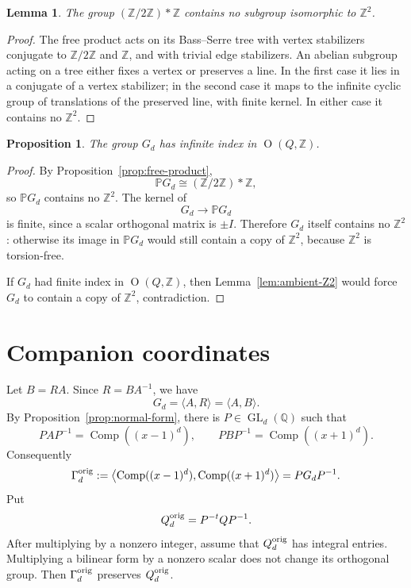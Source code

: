 \documentclass[a4paper,11pt]{amsart}
\newtheorem{proposition}[theorem]{Proposition}
\newtheorem{lemma}[theorem]{Lemma}
\theoremstyle{remark}
\newcommand{\Z}{\mathbb Z}
\newcommand{\Q}{\mathbb Q}
\newcommand{\PP}{\mathbb P}
\DeclareMathOperator{\Comp}{Comp}
\DeclareMathOperator{\GL}{GL}
\DeclareMathOperator{\Ogrp}{O}
\numberwithin{equation}{section}
\begin{document}
\begin{lemma}\label{lem:free-product-no-Z2}
The group \((\Z/2\Z)*\Z\) contains no subgroup isomorphic to \(\Z^2\).
\end{lemma}

\begin{proof}
The free product acts on its Bass--Serre tree with vertex stabilizers conjugate to \(\Z/2\Z\) and \(\Z\), and with trivial edge stabilizers.  An abelian subgroup acting on a tree either fixes a vertex or preserves a line.  In the first case it lies in a conjugate of a vertex stabilizer; in the second case it maps to the infinite cyclic group of translations of the preserved line, with finite kernel.  In either case it contains no \(\Z^2\).
\end{proof}

\begin{proposition}\label{prop:infinite-index}
The group \(G_d\) has infinite index in \(\Ogrp(Q,\Z)\).
\end{proposition}

\begin{proof}
By Proposition~\ref{prop:free-product},
\[
        \PP G_d\cong(\Z/2\Z)*\Z,
\]
so \(\PP G_d\) contains no \(\Z^2\).  The kernel of
\[
        G_d\longrightarrow \PP G_d
\]
is finite, since a scalar orthogonal matrix is \(\pm I\).  Therefore \(G_d\) itself contains no \(\Z^2\): otherwise its image in \(\PP G_d\) would still contain a copy of \(\Z^2\), because \(\Z^2\) is torsion-free.

If \(G_d\) had finite index in \(\Ogrp(Q,\Z)\), then Lemma~\ref{lem:ambient-Z2} would force \(G_d\) to contain a copy of \(\Z^2\), contradiction.
\end{proof}

\section{Companion coordinates}

Let \(B=RA\).  Since \(R=BA^{-1}\), we have
\[
        G_d=\langle A,R\rangle=\langle A,B\rangle.
\]
By Proposition~\ref{prop:normal-form}, there is \(P\in\GL_d(\Q)\) such that
\[
        P A P^{-1}=\Comp((x-1)^d),
        \qquad
        P B P^{-1}=\Comp((x+1)^d).
\]
Consequently
\[
        \Gamma_d^{\rm orig}:=
        \left\langle
        \Comp((x-1)^d),\Comp((x+1)^d)
        \right\rangle
        =P G_d P^{-1}.
\]
Put
\[
        Q_d^{\rm orig}=P^{-t}QP^{-1}.
\]
After multiplying by a nonzero integer, assume that \(Q_d^{\rm orig}\) has integral entries.  Multiplying a bilinear form by a nonzero scalar does not change its orthogonal group.  Then \(\Gamma_d^{\rm orig}\) preserves \(Q_d^{\rm orig}\).
\end{document}
